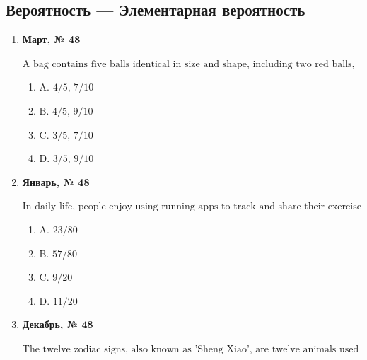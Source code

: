 \subsection*{Вероятность — Элементарная вероятность}
\begin{enumerate}
\item \textbf{Март, № 48} \par \smallskip
$\displaystyle \text{A bag contains five balls identical in size and shape, including two red balls, labeled 1 and 2, two black balls, labeled 1 and 2, one white ball, labeled 1. Two balls are drawn randomly without replacement. The probability that the balls have different colors, and the probability that at least one of the two balls is labeled 1 are respectively}$
\begin{enumerate}
\item $\displaystyle \text{A. 4/5, 7/10}$
\item $\displaystyle \text{B. 4/5, 9/10}$
\item $\displaystyle \text{C. 3/5, 7/10}$
\item $\displaystyle \text{D. 3/5, 9/10}$
\end{enumerate}
\item \textbf{Январь, № 48} \par \smallskip
$\displaystyle \text{In daily life, people enjoy using running apps to track and share their exercise routes. To understand the usage of running apps among high school and college students in a certain region, 200 high school students and 80 college students were randomly chosen, and their favorite running apps were recorded as follows. Assuming that college students' and high school students' preferences for running apps are independent of each other, if one person is randomly selected from each group, the probability that their favorite running apps are different is ( ).}$
\begin{enumerate}
\item $\displaystyle \text{A. 23/80}$
\item $\displaystyle \text{B. 57/80}$
\item $\displaystyle \text{C. 9/20}$
\item $\displaystyle \text{D. 11/20}$
\end{enumerate}
\item \textbf{Декабрь, № 48} \par \smallskip
$\displaystyle \text{The twelve zodiac signs, also known as 'Sheng Xiao', are twelve animals used in China to represent years, in order: Rat, Ox, Tiger, Rabbit, Dragon, Snake, Horse, Sheep, Monkey, Rooster, Dog, Pig. For example, people born in 1984, 1996, and 2008 are of the Rat sign, while those born in 1985, 1997, and 2009 are of the Ox sign, and so on. The probability that at least two out of three randomly selected people have the same zodiac sign is}$

\end{enumerate}
